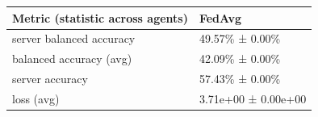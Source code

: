 \begin{tabular}{ll}
\hline
 Metric (statistic across agents)   & FedAvg              \\
\hline
 server balanced accuracy           & 49.57\% ± 0.00\%      \\
 balanced accuracy (avg)            & 42.09\% ± 0.00\%      \\
 server accuracy                    & 57.43\% ± 0.00\%      \\
 loss (avg)                         & 3.71e+00 ± 0.00e+00 \\
\hline
\end{tabular}
